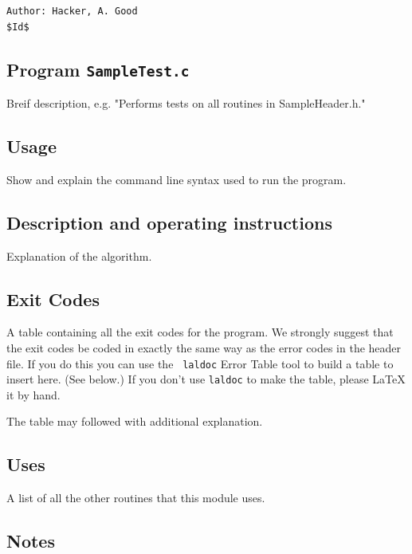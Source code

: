 \documentclass[oneside]{book}
\begin{document}
\vfill{\footnotesize{
\vspace{-1ex}
\mbox{}
\vspace{-3ex}
\begin{verbatim}
Author: Hacker, A. Good
$Id$
\end{verbatim}



\newpage

\subsection*{Program {\texttt {SampleTest.c}}}
Breif description, e.g. "Performs tests on all routines in SampleHeader.h."

\subsection*{Usage}
Show and explain the command line syntax used to run the program.

\subsection*{Description and operating instructions}
Explanation of the algorithm.



\subsection*{Exit Codes}

A table containing all the exit codes for the program.  We strongly
suggest that the exit codes be coded in exactly the same way as the
error codes in the header file.  If you do this you can use the {\tt
laldoc} Error Table tool to build a table to insert here. (See below.)
If you don't use {\tt laldoc} to make the table, please LaTeX it by
hand.

The table may followed with additional explanation.

\subsection*{Uses}

A list of all the other routines that this module uses.

\subsection*{Notes}


}}
\end{document}
